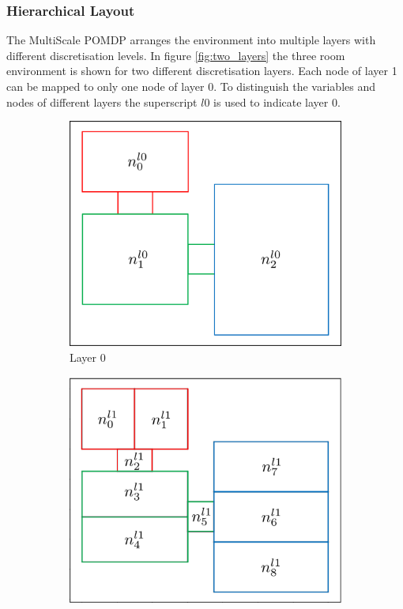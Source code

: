 \subsubsection{Hierarchical Layout}
The MultiScale POMDP arranges the environment into multiple layers with different discretisation levels. In figure \ref{fig:two_layers} the three room environment is shown for two different discretisation layers. Each node of layer 1 can be mapped to only one node of layer 0. To distinguish the variables and nodes of different layers the superscript $l0$ is used to indicate layer $0$. 
\begin{figure}
    \centering
    \begin{subfigure}[b]{0.48\textwidth}
        \includegraphics[width=\textwidth]{Report/images/layer0_b.png}
        \caption[t]{Layer 0}
        \label{subfig:l0}
    \end{subfigure}
    \hfill
    \begin{subfigure}[b]{0.48\textwidth}
        \includegraphics[width=\textwidth]{Report/images/layer1.png}

\end{subfigure}
\end{figure}
